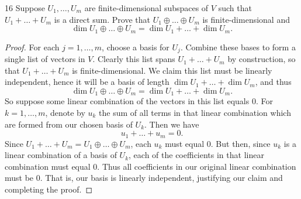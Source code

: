 \documentclass[11pt]{extarticle}
\newenvironment{problem}[1]{\begin{prob*}{#1}{}}{\end{prob*}}
\begin{document}
\begin{problem}{16}
Suppose $U_1,\dots, U_m$ are finite-dimensional subspaces of $V$ such that $U_1 + \dots + U_m$ is a direct sum.  Prove that $U_1\oplus\dots\oplus U_m$ is finite-dimensional and 
\begin{equation*}
\dim U_1\oplus \dots \oplus U_m = \dim U_1 + \dots + \dim U_m.
\end{equation*}
\end{problem}
\begin{proof}
For each $j = 1,\dots,m$, choose a basis for $U_j$.  Combine these bases to form a single list of vectors in $V$.  Clearly this list spans $U_1 + \dots + U_m$ by construction, so that $U_1 + \dots + U_m$ is finite-dimensional.  We claim this list must be linearly independent, hence it will be a basis of length $\dim U_1 + \dots + \dim U_m$, and thus
\begin{equation*}
\dim U_1\oplus \dots \oplus U_m = \dim U_1 + \dots + \dim U_m.
\end{equation*}
So suppose some linear combination of the vectors in this list equals $0$.  For $k=1,\dots,m$, denote by $u_k$ the sum of all terms in that linear combination which are formed from our chosen basis of $U_k$.  Then we have
\begin{equation*}
u_1 + \dots + u_m = 0.
\end{equation*}
Since $U_1 + \dots + U_m = U_1\oplus\dots\oplus U_m$, each $u_k$ must equal $0$.  But then, since $u_k$ is a linear combination of a basis of $U_k$, each of the coefficients in that linear combination must equal $0$.  Thus all coefficients in our original linear combination must be $0$.  That is, our basis is linearly independent, justifying our claim and completing the proof.
\end{proof}
\end{document}
